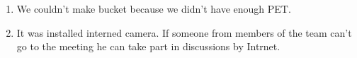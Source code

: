 \begin{enumerate}
\begin{enumerate}
		\item We couldn't make bucket because we didn't have enough PET. 
		
		\item It was installed interned camera. If someone from members of the team can't go to the meeting he can take part in discussions by Intrnet.
		 		         \begin{figure}[H]
		 		         	\begin{minipage}[h]{0.2\linewidth}
		 		         		\center  
		 		         	\end{minipage}
		 		         	\begin{minipage}[h]{0.6\linewidth}

\end{minipage}
\end{figure}
\end{enumerate}
\end{enumerate}
